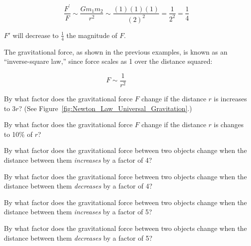 \documentclass[main-physics.tex]{subfiles}
\begin{document}
\begin{equation*}
    \frac{F^{\prime}}{F} \sim \frac{G m_1 m_2}{r^2} \sim \frac{(1)(1)(1)}{(2)^2} = \frac{1}{2^2} =\frac{1}{4}
\end{equation*}

$F'$ will decrease to $\frac{1}{4}$ the magnitude of $F$.

\vspace{1ex}
\cyanhrule
\vspace{1ex}

The gravitational force, as shown in the previous examples, is known as an ``inverse-square law,'' since force scales as 1 over the distance squared:

\begin{equation*} \tag{inverse-square law}
    F \sim \frac{1}{r^2} \hspace{3em}
\end{equation*}

\begin{exercise} \label{WhkfQ4}
By what factor does the gravitational force $F$ change if the distance $r$ is increases to $3r$? (See Figure~\ref{fig:Newton_Law_Universal_Gravitation}.) 
\end{exercise}

\begin{exercise} \label{CqOs7y}
By what factor does the gravitational force $F$ change if the distance $r$ is changes to 10\% of $r$? 
\end{exercise}

\begin{exercise} \label{PwaIbN}
By what factor does the gravitational force between two objects change when the distance between them \textit{increases} by a factor of 4?
\end{exercise}

\begin{exercise} \label{akw9Hx}
By what factor does the gravitational force between two objects change when the distance between them \textit{decreases} by a factor of 4?
\end{exercise}

\begin{exercise} \label{Dhfy9M}
By what factor does the gravitational force between two objects change when the distance between them \textit{increases} by a factor of 5?
\end{exercise}

\begin{exercise} \label{gjeHTU}
By what factor does the gravitational force between two objects change when the distance between them \textit{decreases} by a factor of 5?
\end{exercise}
\end{document}
